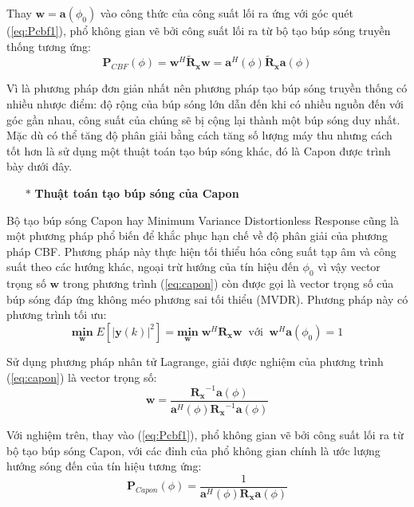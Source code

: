 Thay $\mathbf{w} = \mathbf{a}(\phi_{0})$ vào công thức của công suất lối ra ứng với góc quét (\ref{eq:Pcbf1}), phổ không gian vẽ bởi công suất lối ra từ bộ tạo búp sóng truyền thống tương ứng:
\begin{equation}
	\mathbf{P}_{CBF}(\phi) =\mathbf{w}^{H}\tilde{\mathbf{R}}_{\mathbf{x}}\mathbf{w} = \mathbf{a}^{H}(\phi)\tilde{\mathbf{R}}_{\mathbf{x}}\mathbf{a}(\phi)
\end{equation}

Vì là phương pháp đơn giản nhất nên phương pháp tạo búp sóng truyền thống có nhiều nhược điểm: độ rộng của búp sóng lớn dẫn đến khi có nhiều nguồn đến với góc gần nhau, công suất của chúng sẽ bị cộng lại thành một búp sóng duy nhất. Mặc dù có thể tăng độ phân giải bằng cách tăng số lượng máy thu nhưng cách tốt hơn là sử dụng một thuật toán tạo búp sóng khác, đó là Capon được trình bày dưới đây.

\begin{itemize}
	\item[$\ast$] \textbf{Thuật toán tạo búp sóng của Capon}
\end{itemize}

Bộ tạo búp sóng Capon \cite{Capon2009} hay Minimum Variance Distortionless Response cũng là một phương pháp phổ biến để khắc phục hạn chế về độ phân giải của phương pháp CBF. Phương pháp này thực hiện tối thiểu hóa công suất tạp âm và công suất theo các hướng khác, ngoại trừ hướng của tín hiệu đến $\phi_{0}$ vì vậy vector trọng số $\mathbf{w}$ trong phương trình (\ref{eq:capon}) còn được gọi là vector trọng số của búp sóng đáp ứng không méo phương sai tối thiểu (MVDR). Phương pháp này có phương trình tối ưu:
\begin{equation}
	\underset{\mathbf{w}}{\mathbf{min}}\; E[|\mathbf{y}(k)|^{2}] = \underset{\mathbf{w}}{\mathbf{min}}\; \mathbf{w}^{H}\mathbf{R}_{\mathbf{x}}\mathbf{w} \;\;\textrm{với}\;\; \mathbf{w}^{H}\mathbf{a}(\phi_{0}) = 1
\label{eq:capon} 
\end{equation}

Sử dụng phương pháp nhân tử Lagrange,  giải được nghiệm của phương trình (\ref{eq:capon}) là vector trọng số:
\begin{equation}
	\mathbf{w} = \frac{{\mathbf{R}_{\mathbf{x}}}^{-1}\mathbf{a}(\phi)}{\mathbf{a}^{H}(\phi){\mathbf{R}_{\mathbf{x}}}^{-1}\mathbf{a}(\phi)}
\end{equation}

Với nghiệm trên, thay vào (\ref{eq:Pcbf1}), phổ không gian vẽ bởi công suất lối ra từ bộ tạo búp sóng Capon, với các đỉnh của phổ không gian chính là ước lượng hướng sóng đến của tín hiệu tương ứng:
\begin{equation}
	\mathbf{P}_{Capon}(\phi) = \frac{1}{\mathbf{a}^{H}(\phi)\mathbf{R}_{\mathbf{x}}\mathbf{a}(\phi)}
\end{equation}

